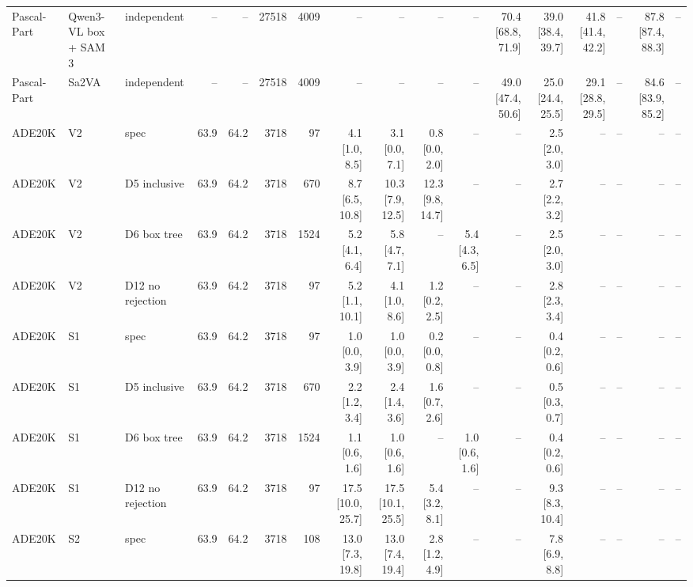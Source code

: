 \begin{tabular}{lllrrrrrrrrrrrrrl}
Pascal-Part & Qwen3-VL box + SAM 3 & independent & -- & -- & 27518 & 4009 & -- & -- & -- & -- & 70.4 \scriptsize{[68.8, 71.9]} & 39.0 \scriptsize{[38.4, 39.7]} & 41.8 \scriptsize{[41.4, 42.2]} & -- & 87.8 \scriptsize{[87.4, 88.3]} & -- \\
Pascal-Part & Sa2VA & independent & -- & -- & 27518 & 4009 & -- & -- & -- & -- & 49.0 \scriptsize{[47.4, 50.6]} & 25.0 \scriptsize{[24.4, 25.5]} & 29.1 \scriptsize{[28.8, 29.5]} & -- & 84.6 \scriptsize{[83.9, 85.2]} & -- \\
\midrule
ADE20K & V2 & spec & 63.9 & 64.2 & 3718 & 97 & 4.1 \scriptsize{[1.0, 8.5]} & 3.1 \scriptsize{[0.0, 7.1]} & 0.8 \scriptsize{[0.0, 2.0]} & -- & -- & 2.5 \scriptsize{[2.0, 3.0]} & -- & -- & -- & -- \\
ADE20K & V2 & D5 inclusive & 63.9 & 64.2 & 3718 & 670 & 8.7 \scriptsize{[6.5, 10.8]} & 10.3 \scriptsize{[7.9, 12.5]} & 12.3 \scriptsize{[9.8, 14.7]} & -- & -- & 2.7 \scriptsize{[2.2, 3.2]} & -- & -- & -- & -- \\
ADE20K & V2 & D6 box tree & 63.9 & 64.2 & 3718 & 1524 & 5.2 \scriptsize{[4.1, 6.4]} & 5.8 \scriptsize{[4.7, 7.1]} & -- & 5.4 \scriptsize{[4.3, 6.5]} & -- & 2.5 \scriptsize{[2.0, 3.0]} & -- & -- & -- & -- \\
ADE20K & V2 & D12 no rejection & 63.9 & 64.2 & 3718 & 97 & 5.2 \scriptsize{[1.1, 10.1]} & 4.1 \scriptsize{[1.0, 8.6]} & 1.2 \scriptsize{[0.2, 2.5]} & -- & -- & 2.8 \scriptsize{[2.3, 3.4]} & -- & -- & -- & -- \\
ADE20K & S1 & spec & 63.9 & 64.2 & 3718 & 97 & 1.0 \scriptsize{[0.0, 3.9]} & 1.0 \scriptsize{[0.0, 3.9]} & 0.2 \scriptsize{[0.0, 0.8]} & -- & -- & 0.4 \scriptsize{[0.2, 0.6]} & -- & -- & -- & -- \\
ADE20K & S1 & D5 inclusive & 63.9 & 64.2 & 3718 & 670 & 2.2 \scriptsize{[1.2, 3.4]} & 2.4 \scriptsize{[1.4, 3.6]} & 1.6 \scriptsize{[0.7, 2.6]} & -- & -- & 0.5 \scriptsize{[0.3, 0.7]} & -- & -- & -- & -- \\
ADE20K & S1 & D6 box tree & 63.9 & 64.2 & 3718 & 1524 & 1.1 \scriptsize{[0.6, 1.6]} & 1.0 \scriptsize{[0.6, 1.6]} & -- & 1.0 \scriptsize{[0.6, 1.6]} & -- & 0.4 \scriptsize{[0.2, 0.6]} & -- & -- & -- & -- \\
ADE20K & S1 & D12 no rejection & 63.9 & 64.2 & 3718 & 97 & 17.5 \scriptsize{[10.0, 25.7]} & 17.5 \scriptsize{[10.1, 25.5]} & 5.4 \scriptsize{[3.2, 8.1]} & -- & -- & 9.3 \scriptsize{[8.3, 10.4]} & -- & -- & -- & -- \\
ADE20K & S2 & spec & 63.9 & 64.2 & 3718 & 108 & 13.0 \scriptsize{[7.3, 19.8]} & 13.0 \scriptsize{[7.4, 19.4]} & 2.8 \scriptsize{[1.2, 4.9]} & -- & -- & 7.8 \scriptsize{[6.9, 8.8]} & -- & -- & -- & -- \\

\end{tabular}
